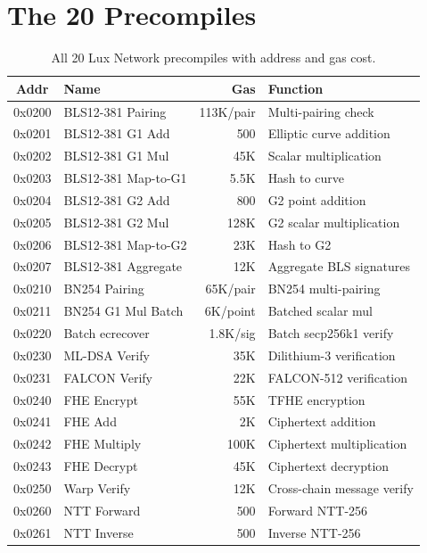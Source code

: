 \section{The 20 Precompiles}


\begin{table}[H]
\centering
\small
\begin{tabular}{@{}clrl@{}}
\toprule
\textbf{Addr} & \textbf{Name} & \textbf{Gas} & \textbf{Function} \\
\midrule
0x0200 & BLS12-381 Pairing & 113K/pair & Multi-pairing check \\
0x0201 & BLS12-381 G1 Add & 500 & Elliptic curve addition \\
0x0202 & BLS12-381 G1 Mul & 45K & Scalar multiplication \\
0x0203 & BLS12-381 Map-to-G1 & 5.5K & Hash to curve \\
0x0204 & BLS12-381 G2 Add & 800 & G2 point addition \\
0x0205 & BLS12-381 G2 Mul & 128K & G2 scalar multiplication \\
0x0206 & BLS12-381 Map-to-G2 & 23K & Hash to G2 \\
0x0207 & BLS12-381 Aggregate & 12K & Aggregate BLS signatures \\
0x0210 & BN254 Pairing & 65K/pair & BN254 multi-pairing \\
0x0211 & BN254 G1 Mul Batch & 6K/point & Batched scalar mul \\
0x0220 & Batch ecrecover & 1.8K/sig & Batch secp256k1 verify \\
0x0230 & ML-DSA Verify & 35K & Dilithium-3 verification \\
0x0231 & FALCON Verify & 22K & FALCON-512 verification \\
0x0240 & FHE Encrypt & 55K & TFHE encryption \\
0x0241 & FHE Add & 2K & Ciphertext addition \\
0x0242 & FHE Multiply & 100K & Ciphertext multiplication \\
0x0243 & FHE Decrypt & 45K & Ciphertext decryption \\
0x0250 & Warp Verify & 12K & Cross-chain message verify \\
0x0260 & NTT Forward & 500 & Forward NTT-256 \\
0x0261 & NTT Inverse & 500 & Inverse NTT-256 \\
\bottomrule
\end{tabular}
\caption{All 20 Lux Network precompiles with address and gas cost.}
\end{table}

